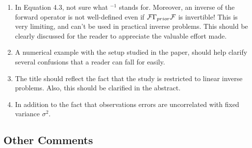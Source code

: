\documentclass{amsart}
\numberwithin{equation}{section}
\begin{document}
\begin{enumerate}
    \item In Equation 4.3, not sure what $^{-1}$ stands
      for. Moreover, an inverse of the forward operator is not
      well-defined even if $\mathcal{F}\Gamma_{prior}\mathcal{F}$ is invertible!
      This is very limiting, and can't be used in practical inverse
      problems. This should be clearly discussed for the reader to
      appreciate the valuable effort made.

    \item A numerical example with the setup studied in the paper,
      should help clarify several confusions that a reader can fall
      for easily.
      
    \item The title should reflect the fact that the study is
      restricted to linear inverse problems. Also, this should be
      clarified in the abstract.

    \item In addition to the fact that observations errors are
      uncorrelated with fixed variance $\sigma^2$.

\end{enumerate}

\subsection{Other Comments}
\end{document}
